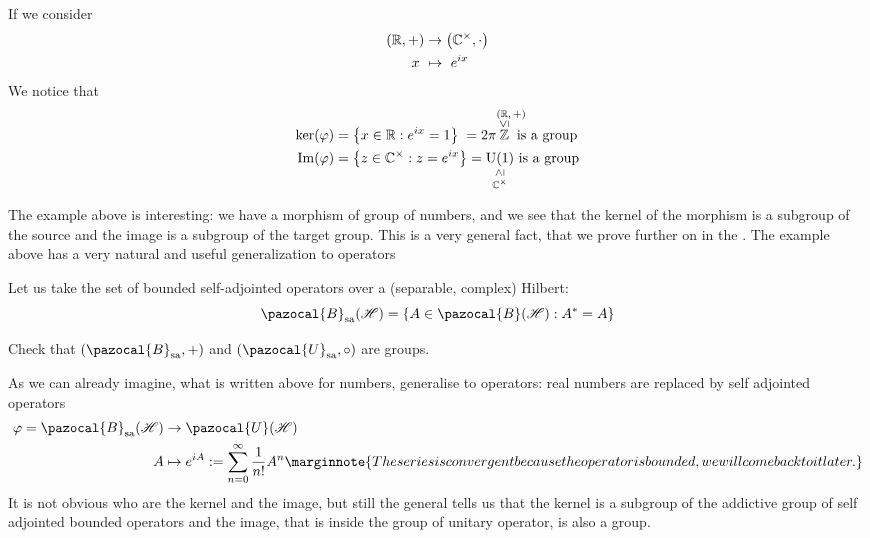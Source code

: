 \documentclass[../main.tex]{subfiles}
\begin{document}
\begin{example}
If we consider
\[
\begin{split}
    \pqty{\mathbb{R},+}&\to \pqty{\mathbb{C}^\times,\cdot}\\
    x \ &\mapsto\ e^{ix}
\end{split}
\]
We notice that
\[
\begin{split}
\ker(\varphi)&=\Bqty{x\in \mathbb{R}: e^{ix} = 1}\;=2\pi\overset{\text{\parbox{0.4 cm}{\centering $(\mathbb{R},+)$ \\[-4pt]  {\rotatebox{90}{$\leq$}}}}}{\mathbb{Z}}\textrm{ is a group}\\
\Im(\varphi)&=\Bqty{z\in \mathbb{C}^\times: z=e^{ix}}=\underset{\text{\parbox{0.6 cm}{\centering  {\rotatebox{90}{$\geq$}}\\[-4pt] $\mathbb{C}^\times$ }}}{\textrm{U}(1)}\textrm{ is a group}
\end{split}
\]
\end{example}
The example above is interesting: we have a morphism of group of numbers, and we see that the kernel of the morphism is a subgroup of the source and the image is a subgroup of the target group. This is a very general fact, that we prove further on in the . The example above has a very natural and useful generalization to operators
\begin{example}
Let us take the set of bounded self-adjointed operators over a (separable, complex) Hilbert:
\[
\pazocal{B}_{\textrm{sa}}(\mathcal{H})=\Bqty{A\in\pazocal{B}(\mathcal{H}):A^\ast=A}
\]
\begin{exercise}
Check that $\pqty{\pazocal{B}_{\textrm{sa}}, +}$ and $\pqty{\pazocal{U}_{\textrm{sa}}, \circ}$ are groups.
\end{exercise}
\end{example}
As we can already imagine, what is written above for numbers, generalise to operators: real numbers are replaced by self adjointed operators
\[
\begin{split}
\varphi = \pazocal{B}_{\textrm{sa}}(\mathcal{H}) &\to \pazocal{U}(\mathcal{H})\\
A&\mapsto e^{iA}:=\sum_{n=0}^\infty \frac{1}{n!}A^n\marginnote{The series is convergent because the operator is bounded, we will come back to it later.}
\end{split}
\]
It is not obvious who are the kernel and the image, but still the general  tells us that the kernel is a subgroup of the addictive group of self adjointed bounded operators and the image, that is inside the group of unitary operator, is also a group.
\end{document}
